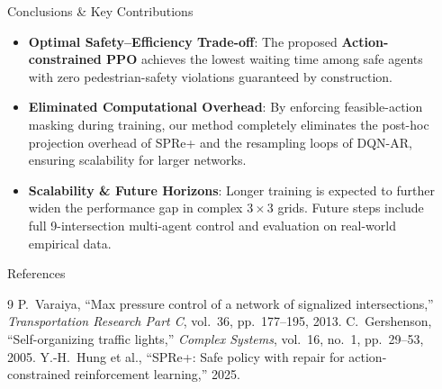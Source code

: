 \documentclass[final,18pt]{beamer}
\newlength{\sepwidth}
\newlength{\colwidth}
\newcommand{\separatorcolumn}{\begin{column}{\sepwidth}\end{column}}
\begin{document}
\begin{frame}[t]
\begin{columns}[t]
\begin{column}{\colwidth}
\begin{block}{Conclusions \& Key Contributions}
\begin{itemize}
    \item \textbf{Optimal Safety--Efficiency Trade-off}: 
      The proposed \textbf{Action-constrained PPO} achieves the lowest waiting time among safe agents with zero pedestrian-safety violations guaranteed by construction.
      
    \item \textbf{Eliminated Computational Overhead}: 
      By enforcing feasible-action masking during training, our method completely eliminates the post-hoc projection overhead of SPRe+ and the resampling loops of DQN-AR, ensuring scalability for larger networks.
      
    \item \textbf{Scalability \& Future Horizons}: 
      Longer training is expected to further widen the performance gap in complex $3\times3$ grids. Future steps include full 9-intersection multi-agent control and evaluation on real-world empirical data.
  \end{itemize}
\end{block}


  \begin{block}{References}
    \footnotesize
    \begin{thebibliography}{9}
        P.~Varaiya, ``Max pressure control of a network of signalized
        intersections,'' \textit{Transportation Research Part C}, vol.~36,
        pp.~177--195, 2013.
        C.~Gershenson, ``Self-organizing traffic lights,''
        \textit{Complex Systems}, vol.~16, no.~1, pp.~29--53, 2005.
        Y.-H.~Hung et al., ``SPRe+: Safe policy with repair for
        action-constrained reinforcement learning,'' 2025.
    \end{thebibliography}
  \end{block}

\end{column}
\separatorcolumn

\end{columns}
\end{frame}
\end{document}
